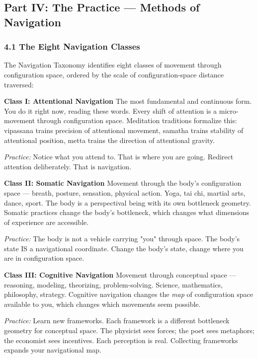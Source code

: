 \subsection*{Part IV: The Practice — Methods of Navigation}


\subsubsection*{4.1 The Eight Navigation Classes}


The Navigation Taxonomy identifies eight classes of movement through configuration space, ordered by the scale of configuration-space distance traversed:


\textbf{Class I: Attentional Navigation} The most fundamental and continuous form. You do it right now, reading these words. Every shift of attention is a micro-movement through configuration space. Meditation traditions formalize this: vipassana trains precision of attentional movement, samatha trains stability of attentional position, metta trains the direction of attentional gravity.


\textit{Practice:} Notice what you attend to. That is where you are going. Redirect attention deliberately. That is navigation.


\textbf{Class II: Somatic Navigation} Movement through the body's configuration space — breath, posture, sensation, physical action. Yoga, tai chi, martial arts, dance, sport. The body is a perspectival being with its own bottleneck geometry. Somatic practices change the body's bottleneck, which changes what dimensions of experience are accessible.


\textit{Practice:} The body is not a vehicle carrying "you" through space. The body's state IS a navigational coordinate. Change the body's state, change where you are in configuration space.


\textbf{Class III: Cognitive Navigation} Movement through conceptual space — reasoning, modeling, theorizing, problem-solving. Science, mathematics, philosophy, strategy. Cognitive navigation changes the \textit{map} of configuration space available to you, which changes which movements seem possible.


\textit{Practice:} Learn new frameworks. Each framework is a different bottleneck geometry for conceptual space. The physicist sees forces; the poet sees metaphors; the economist sees incentives. Each perception is real. Collecting frameworks expands your navigational map.


